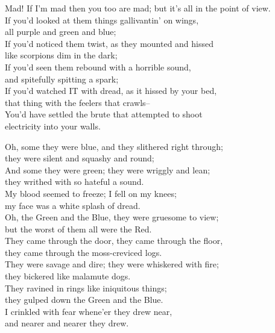 \begin{poemblock}
Mad!  If I'm mad then you too are mad; but it's all in the point of view.\\
If you'd looked at them things gallivantin' on wings,\\
\idt all purple and green and blue;\\
If you'd noticed them twist, as they mounted and hissed\\
\idt like scorpions dim in the dark;\\
If you'd seen them rebound with a horrible sound,\\
\idt and spitefully spitting a spark;\\
If you'd watched IT with dread, as it hissed by your bed,\\
\idt that thing with the feelers that crawls--\\
You'd have settled the brute that attempted to shoot\\
\idt electricity into your walls.

Oh, some they were blue, and they slithered right through;\\
\idt they were silent and squashy and round;\\
And some they were green; they were wriggly and lean;\\
\idt they writhed with so hateful a sound.\\
My blood seemed to freeze; I fell on my knees;\\
\idt my face was a white splash of dread.\\
Oh, the Green and the Blue, they were gruesome to view;\\
\idt but the worst of them all were the Red.\\
They came through the door, they came through the floor,\\
\idt they came through the moss-creviced logs.\\
They were savage and dire; they were whiskered with fire;\\
\idt they bickered like malamute dogs.\\
They ravined in rings like iniquitous things;\\
\idt they gulped down the Green and the Blue.\\
I crinkled with fear whene'er they drew near,\\
\idt and nearer and nearer they drew.


\end{poemblock}
